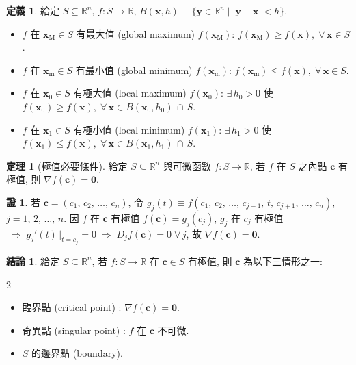 \documentclass[12pt]{extarticle}
\newcommand{\ds}{\displaystyle}
\newcommand{\ie}{\;\Longrightarrow\;}
\theoremstyle{definition}
\newtheorem*{dfn}{定義}
\newtheorem*{fact}{結論}
\newtheorem*{thm}{定理}
\newtheorem*{prf}{證}
\newcommand{\vc}{\mathbf{c}}
\newcommand{\vx}{\mathbf{x}}
\newcommand{\vy}{\mathbf{y}}
\newcommand{\vZero}{\mathbf{0}}
\begin{document}
\begin{dfn}
  給定 $\ds S\subseteq\mathbb{R}^n$, $\ds f:S\to\mathbb{R}$, $\ds B(\vx, h)\equiv\{\vy\in\mathbb{R}^n\;|\;|\vy - \vx| < h\}$. 
  \begin{itemize}\setlength\itemsep{0em}
    \item $f$ 在 $\ds\vx_\text{M}\in S$ 有最大值 (global maximum) $\ds f(\vx_\text{M})$: $\ds f(\vx_\text{M})\geqslant f(\vx),\;\forall\,\vx\in S$. 
    \item $f$ 在 $\ds \vx_\text{m}\in S$ 有最小值 (global minimum) $\ds f(\vx_\text{m})$: $\ds f(\vx_\text{m})\leqslant f(\vx),\;\forall\,\vx\in S$. 
    \item $f$ 在 $\ds\vx_0\in S$ 有極大值 (local maximum) $\ds f(\vx_0)$: $\ds\exists\,h_0 > 0$ 使 $\ds f(\vx_0)\geqslant f(\vx),\;\forall\,\vx\in B(\vx_0, h_0)\,\cap\,S$. 
    \item $f$ 在 $\ds\vx_1\in S$ 有極小值 (local minimum) $\ds f(\vx_1)$: $\ds\exists\,h_1 > 0$ 使 $\ds f(\vx_1)\leqslant f(\vx),\;\forall\,\vx\in B(\vx_1, h_1)\,\cap\,S$. 
  \end{itemize}
\end{dfn}

\begin{thm}[極值必要條件]
  給定 $\ds S\subseteq\mathbb{R}^n$ 與可微函數 $\ds f:S\to\mathbb{R}$, 若 $f$ 在 $S$ 之內點 $\vc$ 有極值, 則 $\ds\nabla f(\vc) = \vZero$. 
\end{thm}

\begin{prf}
  若 $\ds\vc = (c_1,\,c_2,\,\ldots,\,c_n)$, 令 $\ds g_j(t)\equiv f(c_1,\,c_2,\,\ldots,\,c_{j - 1},\,t,\,c_{j + 1},\,\ldots,\,c_n)$, $j = 1,\,2,\,\ldots,\,n$. 因 $f$ 在 $\vc$ 有極值 $f(\vc) = g_j(c_j)$, $g_j$ 在 $c_j$ 有極值 $\ie g_j'(t)\,\big|_{t = c_j} = 0 \ie D_j f(\vc) = 0\;\forall\,j$, 故 $\ds\nabla f(\vc) = \vZero$.  
\end{prf}

\begin{fact}
  給定 $\ds S\subseteq\mathbb{R}^n$, 若 $f:S\to\mathbb{R}$ 在 $\vc\in S$ 有極值, 則 $\vc$ 為以下三情形之一: 
  \begin{multicols}{2}
    \begin{itemize}\setlength\itemsep{0em}
      \item 臨界點 (critical point) : $\ds \nabla f(\vc) = \vZero$. 
      \item 奇異點 (singular point) : $f$ 在 $\vc$ 不可微.  
      \item $S$ 的邊界點 (boundary). 
    \end{itemize}
  \end{multicols}
\end{fact}
\end{document}
